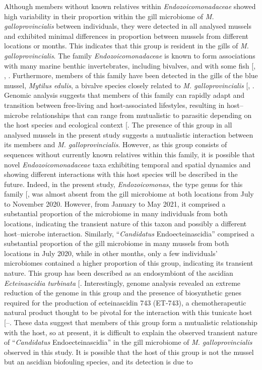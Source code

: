\documentclass[
  12 pt,
]{article}
\begin{document}
Although members without known relatives within \emph{Endozoicomonadaceae} showed high variability in their proportion within the gill microbiome of \emph{M. galloprovincialis} between individuals, they were detected in all analysed mussels and exhibited minimal differences in proportion between mussels from different locations or months. This indicates that this group is resident in the gills of \emph{M. galloprovincialis}. The family \emph{Endozoicomonadaceae} is known to form associations with many marine benthic invertebrates, including bivalves, and with some fish {[}, , \citeproc{ref-Schill2017}{94}{]}. Furthermore, members of this family have been detected in the gills of the blue mussel, \emph{Mytilus edulis}, a bivalve species closely related to \emph{M. galloprovincialis} {[}, \citeproc{ref-Schill2017}{94}{]}. Genomic analysis suggests that members of this family can rapidly adapt and transition between free-living and host-associated lifestyles, resulting in host--microbe relationships that can range from mutualistic to parasitic depending on the host species and ecological context {[}\citeproc{ref-daSilva2025}{93}{]}. The presence of this group in all analysed mussels in the present study suggests a mutualistic interaction between its members and \emph{M. galloprovincialis}. However, as this group consists of sequences without currently known relatives within this family, it is possible that novel \emph{Endozoicomonadaceae} taxa exhibiting temporal and spatial dynamics and showing different interactions with this host species will be described in the future. Indeed, in the present study, \emph{Endozoicomonas}, the type genus for this family {[}\citeproc{ref-Kurahashi2007}{95}{]}, was almost absent from the gill microbiome at both locations from July to November 2020. However, from January to May 2021, it comprised a substantial proportion of the microbiome in many individuals from both locations, indicating the transient nature of this taxon and possibly a different host--microbe interaction. Similarly, ``\emph{Candidatus} Endoecteinascidia'' comprised a substantial proportion of the gill microbiome in many mussels from both locations in July 2020, while in other months, only a few individuals' microbiomes contained a higher proportion of this group, indicating its transient nature. This group has been described as an endosymbiont of the ascidian \emph{Ecteinascidia turbinata} {[}\citeproc{ref-Moss2003}{96}{]}. Interestingly, genome analysis revealed an extreme reduction of the genome in this group and the presence of biosynthetic genes required for the production of ecteinascidin 743 (ET-743), a chemotherapeutic natural product thought to be pivotal for the interaction with this tunicate host {[}--\citeproc{ref-Schofield2015}{99}{]}. These data suggest that members of this group form a mutualistic relationship with the host, so at present, it is difficult to explain the observed transient nature of ``\emph{Candidatus} Endoecteinascidia'' in the gill microbiome of \emph{M. galloprovincialis} observed in this study. It is possible that the host of this group is not the mussel but an ascidian biofouling species, and its detection is due to 
\end{document}
